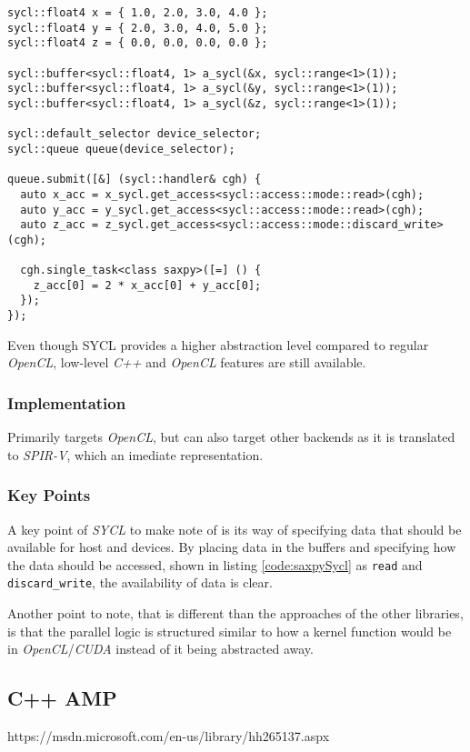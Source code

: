 \begin{lstlisting}[caption={Saxpy implemented in SYCL}, label={code:saxpySycl}]
sycl::float4 x = { 1.0, 2.0, 3.0, 4.0 };
sycl::float4 y = { 2.0, 3.0, 4.0, 5.0 };
sycl::float4 z = { 0.0, 0.0, 0.0, 0.0 };

sycl::buffer<sycl::float4, 1> a_sycl(&x, sycl::range<1>(1));
sycl::buffer<sycl::float4, 1> a_sycl(&y, sycl::range<1>(1));
sycl::buffer<sycl::float4, 1> a_sycl(&z, sycl::range<1>(1));

sycl::default_selector device_selector;
sycl::queue queue(device_selector);

queue.submit([&] (sycl::handler& cgh) {
  auto x_acc = x_sycl.get_access<sycl::access::mode::read>(cgh);
  auto y_acc = y_sycl.get_access<sycl::access::mode::read>(cgh);
  auto z_acc = z_sycl.get_access<sycl::access::mode::discard_write>(cgh);

  cgh.single_task<class saxpy>([=] () {
    z_acc[0] = 2 * x_acc[0] + y_acc[0];
  });
});
\end{lstlisting}

Even though SYCL provides a higher abstraction level compared to regular \textit{OpenCL}, low-level \textit{C++} and \textit{OpenCL} features are still available.

\subsubsection{Implementation}
Primarily targets \textit{OpenCL}, but can also target other backends as it is translated to \textit{SPIR-V}, which an imediate representation.

\subsubsection{Key Points}
A key point of \textit{SYCL} to make note of is its way of specifying data that should be available for host and devices. By placing data in the buffers and specifying how the data should be accessed, shown in listing \ref{code:saxpySycl} as \texttt{read} and \texttt{discard\_write}, the availability of data is clear. 

Another point to note, that is different than the approaches of the other libraries, is that the parallel logic is structured similar to how a kernel function would be in \textit{OpenCL}/\textit{CUDA} instead of it being abstracted away.


\subsection{C++ AMP}
https://msdn.microsoft.com/en-us/library/hh265137.aspx

